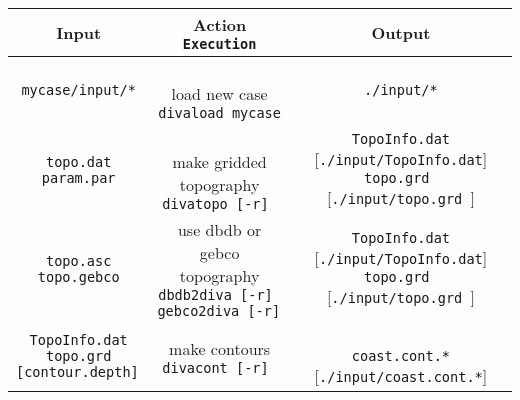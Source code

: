 \documentclass[8pt,a4paper,notitlepage]{book}
\begin{document}
\pagestyle{empty}
\thispagestyle{empty}
\vspace{-6cm}

\vspace{-3cm}
\begin{table}
\centerline{}
\begin{center}
{\small{
\begin{tabular}{c|c|c}
\hline 
{\Large{Input}} & 
\shortstack{\Large{{\sf Action}} \\
{\Large{{\tt Execution}}} } & {\Large{ Output}} \\ \hline 
{\tt mycase/input/*}  & 
\shortstack{ 
{  { }  } \\
{\sf load new case} \\
{\tt divaload mycase} } & {\tt ./input/*} \\ \hline
\shortstack{
{\tt topo.dat} \\
{\tt param.par}
}
 & 
\shortstack{
{  { }  } \\
{\sf make gridded topography} \\
{\tt divatopo [-r]  } 
\\
{  { }  }
}
& 
\shortstack{
{\tt TopoInfo.dat} { } [{\tt ./input/TopoInfo.dat}] \\
{\tt topo.grd }  { } [{\tt ./input/topo.grd }]
}
\\ \hline
 \shortstack{
{\tt topo.asc} \\
{\tt topo.gebco} 
}
 & 
\shortstack{
{\sf use dbdb or gebco topography} \\
{\tt dbdb2diva [-r]  } 
\\
{\tt gebco2diva [-r]  } 
}
& 
\shortstack{
{\tt TopoInfo.dat} { } [{\tt ./input/TopoInfo.dat}] \\
{\tt topo.grd }  { } [{\tt ./input/topo.grd }]
}
 \\ \hline
 \shortstack{
{\tt TopoInfo.dat} \\
{\tt topo.grd} \\
{\tt [contour.depth] }
}
 & 
\shortstack{
{\sf make contours} \\
{\tt divacont [-r]  } 
\\
{  { }  }
}
& 
\shortstack{
{  { }  } \\
{\tt coast.cont.*}  { } [{\tt ./input/coast.cont.*}] \\
{  { }  }
}
 \\ \hline

\end{tabular}}}
\end{center}
\end{table}
\end{document}
